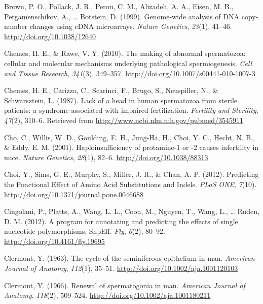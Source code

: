 \documentclass[12pt,twoside]{reedthesis}
\theoremstyle{definition}
\theoremstyle{definition}
\theoremstyle{remark}
\begin{document}
  \hypertarget{ref-Brown1999}{}
  Brown, P. O., Pollack, J. R., Perou, C. M., Alizadeh, A. A., Eisen, M.
  B., Pergamenschikov, A., \ldots{} Botstein, D. (1999). Genome-wide
  analysis of DNA copy-number changes using cDNA microarrays. \emph{Nature
  Genetics}, \emph{23}(1), 41--46. \url{http://doi.org/10.1038/12640}
  
  \hypertarget{ref-Chemes2010}{}
  Chemes, H. E., \& Rawe, V. Y. (2010). The making of abnormal
  spermatozoa: cellular and molecular mechanisms underlying pathological
  spermiogenesis. \emph{Cell and Tissue Research}, \emph{341}(3),
  349--357. \url{http://doi.org/10.1007/s00441-010-1007-3}
  
  \hypertarget{ref-Chemes1987}{}
  Chemes, H. E., Carizza, C., Scarinci, F., Brugo, S., Neuspiller, N., \&
  Schwarsztein, L. (1987). Lack of a head in human spermatozoa from
  sterile patients: a syndrome associated with impaired fertilization.
  \emph{Fertility and Sterility}, \emph{47}(2), 310--6. Retrieved from
  \url{http://www.ncbi.nlm.nih.gov/pubmed/3545911}
  
  \hypertarget{ref-Cho2001}{}
  Cho, C., Willis, W. D., Goulding, E. H., Jung-Ha, H., Choi, Y. C.,
  Hecht, N. B., \& Eddy, E. M. (2001). Haploinsufficiency of protamine-1
  or -2 causes infertility in mice. \emph{Nature Genetics}, \emph{28}(1),
  82--6. \url{http://doi.org/10.1038/88313}
  
  \hypertarget{ref-Choi2012}{}
  Choi, Y., Sims, G. E., Murphy, S., Miller, J. R., \& Chan, A. P. (2012).
  Predicting the Functional Effect of Amino Acid Substitutions and Indels.
  \emph{PLoS ONE}, \emph{7}(10).
  \url{http://doi.org/10.1371/journal.pone.0046688}
  
  \hypertarget{ref-Cingolani2012}{}
  Cingolani, P., Platts, A., Wang, L. L., Coon, M., Nguyen, T., Wang, L.,
  \ldots{} Ruden, D. M. (2012). A program for annotating and predicting
  the effects of single nucleotide polymorphisms, SnpEff. \emph{Fly},
  \emph{6}(2), 80--92. \url{http://doi.org/10.4161/fly.19695}
  
  \hypertarget{ref-Clermont1963}{}
  Clermont, Y. (1963). The cycle of the seminiferous epithelium in man.
  \emph{American Journal of Anatomy}, \emph{112}(1), 35--51.
  \url{http://doi.org/10.1002/aja.1001120103}
  
  \hypertarget{ref-Clermont1966}{}
  Clermont, Y. (1966). Renewal of spermatogonia in man. \emph{American
  Journal of Anatomy}, \emph{118}(2), 509--524.
  \url{http://doi.org/10.1002/aja.1001180211}
  
\end{document}
